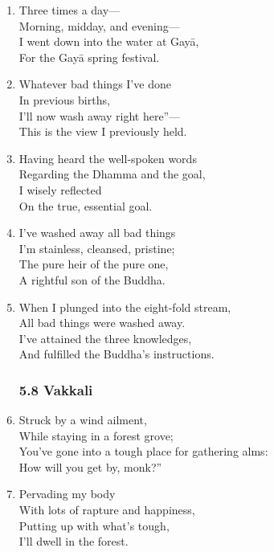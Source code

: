 \documentclass[10pt, openany]{book}
\newcommand*{\vleftofline}[1]{\leavevmode\llap{#1}}
\begin{document}
\begin{enumerate}
\item Three times a day—\\
Morning, midday, and evening—\\
I went down into the water at Gayā,\\
For the Gayā spring festival.

\item \vleftofline{“}Whatever bad things I’ve done\\
In previous births,\\
I’ll now wash away right here”—\\
This is the view I previously held.

\item Having heard the well-spoken words\\
Regarding the Dhamma and the goal,\\
I wisely reflected\\
On the true, essential goal.

\item I’ve washed away all bad things\\
I’m stainless, cleansed, pristine;\\
The pure heir of the pure one,\\
A rightful son of the Buddha.

\item When I plunged into the eight-fold stream,\\
All bad things were washed away.\\
I’ve attained the three knowledges,\\
And fulfilled the Buddha’s instructions.

\subsubsection*{5.8 Vakkali}

\item \vleftofline{“}Struck by a wind ailment,\\
While staying in a forest grove;\\
You’ve gone into a tough place for gathering alms:\\
How will you get by, monk?”

\item \vleftofline{“}Pervading my body\\
With lots of rapture and happiness,\\
Putting up with what’s tough,\\
I’ll dwell in the forest.


\end{enumerate}
\end{document}

